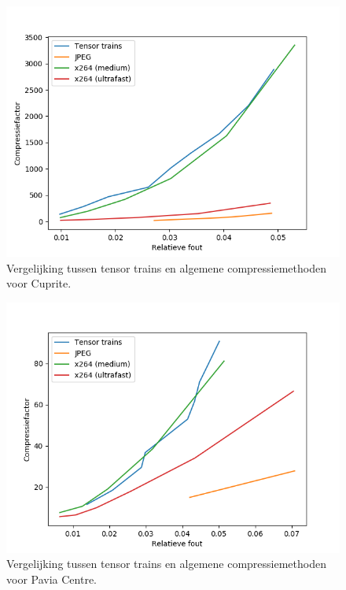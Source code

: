 \begin{figure}[H]
  \centering
  \includegraphics[scale=0.7]{images/general_comparison_Cuprite.png}
  \caption{Vergelijking tussen tensor trains en algemene compressiemethoden voor Cuprite.}
\label{fig:general-comparison-cuprite}
\end{figure}

\begin{figure}[H]
  \centering
  \includegraphics[scale=0.7]{images/general_comparison_Pavia_Centre.png}
  \caption{Vergelijking tussen tensor trains en algemene compressiemethoden voor Pavia Centre.}
\label{fig:general-comparison-pavia-centre}
\end{figure}

